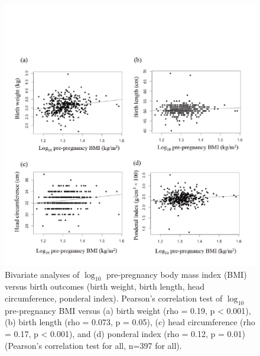 \begin{figure}
  \centering
    \label{fig:Fig38}
  \includegraphics[scale=1]{Figures/Fig38.pdf}
  \caption[Bivariate analyses of $\log_{10}$  pre-pregnancy body mass index versus birth outcomes (birth weight, birth length, head circumference, ponderal index)]{Bivariate analyses of $\log_{10}$  pre-pregnancy body mass index (BMI) versus birth outcomes (birth weight, birth length, head circumference, ponderal index). Pearson's correlation test of $\log_{10}$  pre-pregnancy BMI versus (a) birth weight (rho = 0.19, p < 0.001), (b) birth length (rho = 0.073, p = 0.05), (c) head circumference (rho = 0.17, p < 0.001), and (d) ponderal index (rho = 0.12, p = 0.01) (Pearson's correlation test for all, n=397 for all).}
\end{figure}

